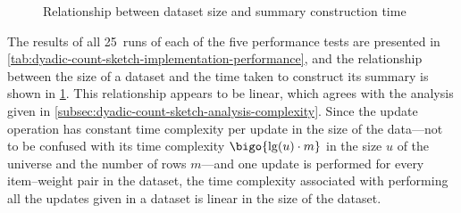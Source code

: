 \begin{figure}
  \centering
  \caption{Relationship between dataset size and summary construction time}
  \label{fig:dyadic-count-sketch-implementation-performance}
\end{figure}

The results of all \num{25}~runs of each of the five performance tests are presented in \cref{tab:dyadic-count-sketch-implementation-performance}, and the relationship between the size of a dataset and the time taken to construct its summary is shown in \cref{fig:dyadic-count-sketch-implementation-performance}.
This relationship appears to be linear, which agrees with the analysis given in \cref{subsec:dyadic-count-sketch-analysis-complexity}.
Since the update operation has constant time complexity per update in the size of the data---not to be confused with its time complexity \( \bigo{\lg (u) \cdot m} \) in the size \( u \) of the universe and the number of rows \( m \)---and one update is performed for every item--weight pair in the dataset, the time complexity associated with performing all the updates given in a dataset is linear in the size of the dataset.
